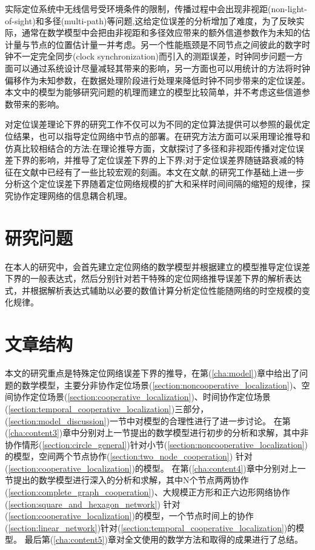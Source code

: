 实际定位系统中无线信号受环境条件的限制，传播过程中会出现非视距(non-light-of-sight)和多径(multi-path)等问题\cite{indoorPos:differentpage},这给定位误差的分析增加了难度，为了反映实际，通常在数学模型中会把由非视距和多径效应带来的额外信道参数作为未知的估计量与节点的位置估计量一并考虑\cite{LimitBound}。另一个性能瓶颈是不同节点之间彼此的数字时钟不一定完全同步(clock synchronization)而引入的测距误差\cite{indoorPos:differentpage2}，时钟同步问题一方面可以通过系统设计尽量减轻其带来的影响，另一方面也可以用统计的方法将时钟偏移作为未知参数，在数据处理阶段进行处理来降低时钟不同步带来的定位误差。本文中的模型为能够研究问题的机理而建立的模型比较简单，并不考虑这些信道参数带来的影响。

对定位误差理论下界的研究工作不仅可以为不同的定位算法提供可以参照的最优定位结果，也可以指导定位网络中节点的部署。在研究方法方面可以采用理论推导和仿真比较相结合的方法:在理论推导方面，文献\cite{LimitBound}探讨了多径和非视距传播对定位误差下界的影响，并推导了定位误差下界的上下界;对于定位误差界随链路衰减的特征在文献\cite{siyi}中已经有了一些比较宏观的刻画。本文在文献\cite{LimitBound},\cite{siyi}的研究工作基础上进一步分析这个定位误差下界随着定位网络规模的扩大和采样时间间隔的缩短的规律，探究协作定理网络的信息耦合机理。

\section{研究问题}
在本人的研究中，会首先建立定位网络的数学模型并根据建立的模型推导定位误差下界的一般表达式，然后分别针对若干特殊的定位网络推导误差下界的解析表达式，并根据解析表达式辅助以必要的数值计算分析定位性能随网络的时空规模的变化规律。

\section{文章结构}
本文的研究重点是特殊定位网络误差下界的推导，在第(\ref{cha:model})章中给出了问题的数学模型，主要分非协作定位场景(\ref{section:noncooperative_localization})、空间协作定位场景(\ref{section:cooperative_localization})、时间协作定位场景(\ref{section:temporal_cooperative_localization})三部分，(\ref{section:model_discussion})一节中对模型的合理性进行了进一步讨论。
在第(\ref{cha:content3})章中分别对上一节提出的数学模型进行初步的分析和求解，其中非协作情形(\ref{section:circle_general})针对小节(\ref{section:noncooperative_localization})的模型，空间两个节点协作(\ref{section:two_node_cooperation})
针对(\ref{section:cooperative_localization})的模型。
在第(\ref{cha:content4})章中分别对上一节提出的数学模型进行深入的分析和求解，其中N个节点两两协作(\ref{section:complete_graph_cooperation})、大规模正方形和正六边形网络协作(\ref{section:square_and_hexagon_network})
针对(\ref{section:cooperative_localization})的模型，一个节点时间上的协作(\ref{section:linear_network})针对(\ref{section:temporal_cooperative_localization})的模型。
最后第(\ref{cha:content5})章对全文使用的数学方法和取得的成果进行了总结。